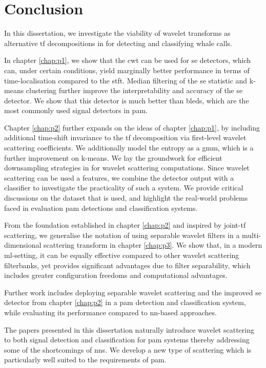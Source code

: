 \chapter{Conclusion}

In this dissertation, we investigate the viability of wavelet transforms as alternative \ac{tf} decompositions in for detecting and classifying whale calls. 

In chapter \ref*{chap:p1}, we show that the \ac{cwt} can be used for \ac{se} detectors, which can, under certain conditions, yield marginally better performance in terms of time-localisation compared to the \ac{stft}. Median filtering of the \ac{se} statistic and k-means clustering further improve the interpretability and accuracy of the \ac{se} detector. We show that this detector is much better than \acp{bled}, which are the most commonly used signal detectors in \ac{pam}.

Chapter \ref*{chap:p2} further expands on the ideas of chapter \ref*{chap:p1}, by including additional time-shift invariance to the \ac{tf} decomposition via first-level wavelet scattering coefficients. We additionally model the entropy as a \ac{gmm}, which is a further improvement on k-means. We lay the groundwork for efficient downsampling strategies in for wavelet scattering computations. Since wavelet scattering can be used a features, we combine the detector output with a classifier to investigate the practicality of such a system. We provide critical discussions on the dataset that is used, and highlight the real-world problems faced in evaluation \ac{pam} detections and classification systems.

From the foundation established in chapter \ref*{chap:p2} and inspired by joint-\ac{tf} scattering, we generalise the notation of using separable wavelet filters in a multi-dimensional scattering transform in chapter \ref*{chap:p3}. We show that, in a modern \ac{ml}-setting, it can be equally effective compared to other wavelet scattering filterbanks, yet provides significant advantages due to filter separability, which includes greater configuration freedoms and computational advantages. 

Further work includes deploying separable wavelet scattering and the improved \ac{se} detector from chapter \ref*{chap:p2} in a \ac{pam} detection and classification system, while evaluating its performance compared to \ac{nn}-based approaches.

The papers presented in this dissertation naturally introduce wavelet scattering to both signal detection and classification for \ac{pam} systems thereby addressing some of the shortcomings of \acp{nn}. We develop a new type of scattering which is particularly well suited to the requirements of \ac{pam}.